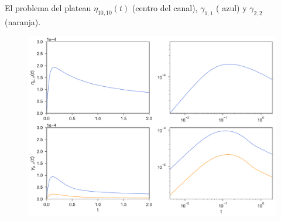 \documentclass{beamer}
\begin{document}




\begin{frame}{El problema del plateau}
  $\eta_{10,10}(t)$ (centro del canal), $\gamma_{1,1}$ ({\color{blue} azul}) y $\gamma_{2,2}$ ({\color{orange}naranja}). 
\begin{figure}[]
  \includegraphics[scale=0.33]{NoPlateau-WALLS-17nodes}
\end{figure}
\end{frame}
\end{document}
